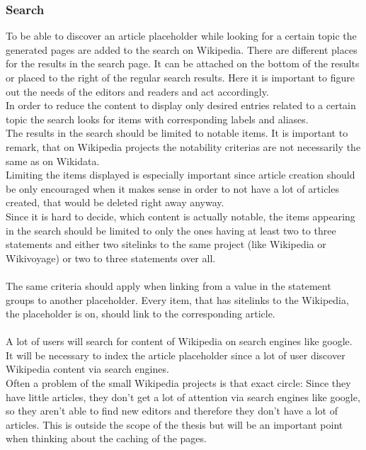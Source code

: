 \subsubsection{Search}
To be able to discover an article placeholder while looking for a certain topic the generated pages are added to the search on Wikipedia. There are different places for the results in the search page. It can be attached on the bottom of the results or placed to the right of the regular search results. Here it is important to figure out the needs of the editors and readers and act accordingly. \\
In order to reduce the content to display only desired entries related to a certain topic the search looks for items with corresponding labels and aliases.  \\
The results in the search should be limited to notable items. It is important to remark, that on Wikipedia projects the notability criterias are not necessarily the same as on Wikidata. \\
Limiting the items displayed is especially important since article creation should be only encouraged when it makes sense in order to not have a lot of articles created, that would be deleted right away anyway.\\
Since it is hard to decide, which content is actually notable, the items appearing in the search should be limited to only the ones having at least two to three statements and either two sitelinks to the same project (like Wikipedia or Wikivoyage) or two to three statements over all. \\
\\
The same criteria should apply when linking from a value in the statement groups to another placeholder. Every item, that has sitelinks to the Wikipedia, the placeholder is on, should link to the corresponding article.  \\
\\
A lot of users will search for content of Wikipedia on search engines like google. It will be necessary to index the article placeholder since a lot of user discover Wikipedia content via search engines.  \\
Often a problem of the small Wikipedia projects is that exact circle: Since they have little articles, they don't get a lot of attention via search engines like google, so they aren't able to find new editors and therefore they don't have a lot of articles. 
This is outside the scope of the thesis but will be an important point when thinking about the caching of the pages. 
